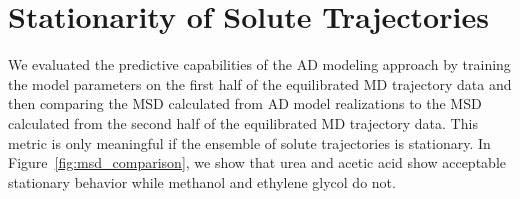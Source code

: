 \documentclass{article}
\begin{document}
  \newpage 
  
  \section{Stationarity of Solute Trajectories}\label{section:msd_comparison}
  
  We evaluated the predictive capabilities of the AD modeling approach by training
  the model parameters on the first half of the equilibrated MD trajectory data and
  then comparing the MSD calculated from AD model realizations to the MSD calculated
  from the second half of the equilibrated MD trajectory data. This metric is
  only meaningful if the ensemble of solute trajectories is stationary. In 
  Figure~\ref{fig:msd_comparison}, we show that urea and acetic acid show acceptable
  stationary behavior while methanol and ethylene glycol do not.
  
\end{document}
